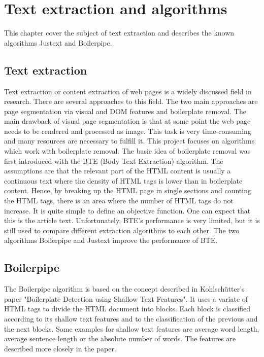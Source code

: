  \section{Text extraction and algorithms}

 This chapter cover the subject of text extraction and describes the known algorithms Justext and Boilerpipe.

 \subsection{Text extraction}

 Text extraction or content extraction of web pages is a widely discussed field in research. There are several approaches to this field. The two main approaches are page segmentation via visual and DOM features and boilerplate removal. The main drawback of visual page segmentation is that at some point the web page needs to be rendered and processed as image. This task is very time-consuming and many resources are necessary to fulfill it. This project focuses on algorithms which work with boilerplate removal.
 The basic idea of boilerplate removal was first introduced with the BTE (Body Text Extraction) algorithm. The assumptions are that the relevant part of the HTML content is usually a continuous text where the density of HTML tags is lower than in boilerplate content. Hence, by breaking up the HTML page in single sections and counting the HTML tags, there is an area where the number of HTML tags do not increase. It is quite simple to define an objective function. One can expect that this is the article text. Unfortunately, BTE's performance is very limited, but it is still used to compare different extraction algorithms to each other. The two algorithms Boilerpipe and Justext improve the performance of BTE.

 \subsection{Boilerpipe}

 The Boilerpipe algorithm is based on the concept described in Kohlschütter's paper "Boilerplate Detection using Shallow Text Features". It uses a variate of HTML tags  to divide the HTML document into blocks. Each block is classified according to its shallow text features and to the classification of the  previous and the next blocks. Some examples for shallow text features are average word length, average sentence length or the absolute number of words. The features are described more closely in the paper.


